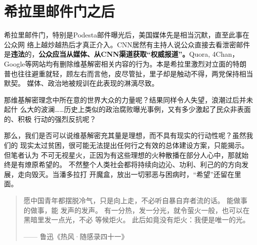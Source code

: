 \section{希拉里邮件门之后}

希拉里邮件门，特别是Podesta邮件曝光后，美国媒体先是相当沉默，直至此事在公众网
络上越炒越热后才真正介入。CNN居然有主持人说公众直接去看泄密邮件
是\textbf{违法}的，\textbf{公众应当从媒体、从CNN渠道获取“权威报道”。}Quora,
4Chan，Google等网站均有删除维基解密相关内容的行为。本是希拉里激烈对立面的特朗
普也往往避重就轻，顾左右而言他，皮尽管扯，里子却是触动不得，两党保持相当默契。
媒体、政治地被规训在此表现的淋漓尽致。

那维基解密理念中所在意的世界大众的力量呢？结果同样令人失望，浪潮过后并未起什
么大的波澜……历史上类似的政治腐败曝光事例，又有多少激起了民众非表面的、积极
行动的强烈反抗呢？

那么，我们是否可以说维基解密充其量是理想，而不具有现实的行动性呢？虽然我们的
现实太过贫困，很可能无法提出任何行之有效的总体建设方案，只能揭示。但笔者认为
不可无视星火，正因为有这些理想的火种散播在部分人心中，那就始终是有燎原希望的。
不然整个人类社会都将持续向边沁、功利、利己的的方向发展，走向毁灭。当潘多拉打
开魔盒，放出一切邪恶与困病时，“希望”还留在里面。

\begin{quotation}
  愿中国青年都摆脱冷气，只是向上走，不必听自暴自弃者流的话。 能做事的做事，能
  发声的发声。 有一分热，发一分光，就令萤火一般，也可以在黑暗里发一点光，不必
  等候炬火。 此后如竟没有炬火：我便是唯一的光。

  \raggedleft
  —— 鲁迅\quad 《热风·随感录四十一》 \qquad
\end{quotation}
